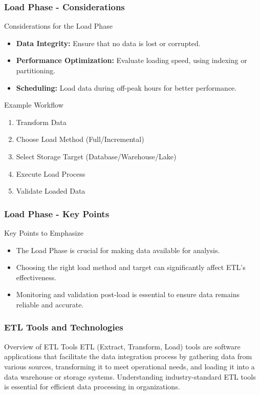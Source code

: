 \documentclass[aspectratio=169]{beamer}
\begin{document}
\begin{frame}[fragile]
    \frametitle{Load Phase - Considerations}
    \begin{block}{Considerations for the Load Phase}
        \begin{itemize}
            \item \textbf{Data Integrity:} Ensure that no data is lost or corrupted.
            \item \textbf{Performance Optimization:} Evaluate loading speed, using indexing or partitioning.
            \item \textbf{Scheduling:} Load data during off-peak hours for better performance.
        \end{itemize}
    \end{block}
    
    \begin{block}{Example Workflow}
        \begin{enumerate}
            \item Transform Data
            \item Choose Load Method (Full/Incremental)
            \item Select Storage Target (Database/Warehouse/Lake)
            \item Execute Load Process
            \item Validate Loaded Data
        \end{enumerate}
    \end{block}
\end{frame}

\begin{frame}[fragile]
    \frametitle{Load Phase - Key Points}
    \begin{block}{Key Points to Emphasize}
        \begin{itemize}
            \item The Load Phase is crucial for making data available for analysis.
            \item Choosing the right load method and target can significantly affect ETL's effectiveness.
            \item Monitoring and validation post-load is essential to ensure data remains reliable and accurate.
        \end{itemize}
    \end{block}
\end{frame}

\begin{frame}[fragile]
    \frametitle{ETL Tools and Technologies}
    \begin{block}{Overview of ETL Tools}
      ETL (Extract, Transform, Load) tools are software applications that facilitate the data integration process by gathering data from various sources, transforming it to meet operational needs, and loading it into a data warehouse or storage systems. Understanding industry-standard ETL tools is essential for efficient data processing in organizations.
    \end{block}
\end{frame}
\end{document}
